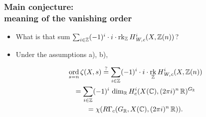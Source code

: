 \documentclass[handout]{beamer}
\newcommand{\ZZ}{\mathbb{Z}}
\newcommand{\RR}{\mathbb{R}}
\newcommand{\CC}{\mathbb{C}}
\DeclareMathOperator{\ord}{ord}
\DeclareMathOperator{\rk}{rk}
\begin{document}

\begin{frame}
  \frametitle{Main conjecture:\\
    meaning of the vanishing order}

  \begin{itemize}
  \item<2-> What is that sum
    $\sum_{i\in\ZZ} (-1)^i \cdot i\cdot \rk_\ZZ H^i_\text{\it W,c} (X, \ZZ(n))$?

  \item<3-> Under the assumptions a), b),

    \begin{multline*}
      \ord_{s=n} \zeta (X,s) \stackrel{?}{=}
      \sum_{i\in\ZZ} (-1)^i \cdot i\cdot \rk_\ZZ H^i_\text{\it W,c} (X, \ZZ(n)) \\
      = \sum_{i\in\ZZ} (-1)^i \, \dim_\RR H^i_c (X (\CC), (2\pi i)^n\,\RR)^{G_\RR} \\
      = \chi (R\Gamma_c (G_\RR, X(\CC), (2\pi i)^n\,\RR)).
    \end{multline*}
  \end{itemize}
\end{frame}

\end{document}

